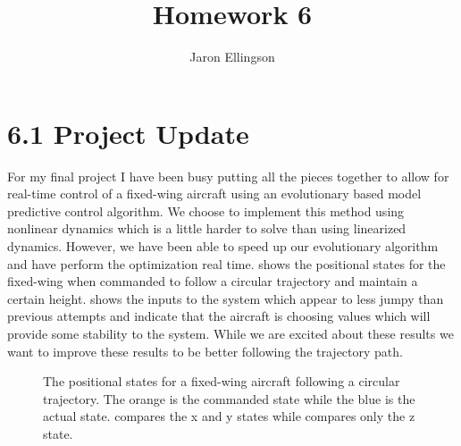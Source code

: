 \documentclass{article}
\begin{document}
\title{Homework 6}
\author{Jaron Ellingson}
\maketitle


\section*{6.1 Project Update}

For my final project I have been busy putting all the pieces together to allow for real-time control of a fixed-wing aircraft using an evolutionary based model predictive control algorithm. We choose to implement this method using nonlinear dynamics which is a little harder to solve than using linearized dynamics. However, we have been able to speed up our evolutionary algorithm and have perform the optimization real time.  shows the positional states for the fixed-wing when commanded to follow a circular trajectory and maintain a certain height.   shows the inputs to the system which appear to less jumpy than previous attempts and indicate that the aircraft is choosing values which will provide some stability to the system. While we are excited about these results we want to improve these results to be better following the trajectory path.

\begin{figure}[htbp]
	\centering
	\qquad
	\caption{The positional states for a fixed-wing aircraft following a circular trajectory. The orange is the commanded state while the blue is the actual state.  compares the x and y states while  compares only the z state.}
	\label{fig:results}
\end{figure}
\end{document}
